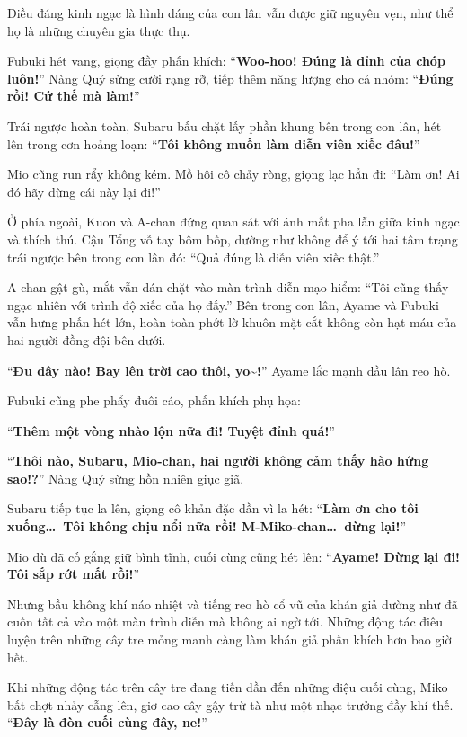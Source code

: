 \documentclass[../main.tex]{subfiles}
\begin{document}
Điều đáng kinh ngạc là hình dáng của con lân vẫn được giữ nguyên vẹn, như thể họ là những chuyên gia thực thụ.

Fubuki hét vang, giọng đầy phấn khích: ``\textbf{Woo-hoo! Đúng là đỉnh của chóp luôn!}'' Nàng Quỷ sừng cười rạng rỡ, tiếp thêm năng lượng cho cả nhóm: ``\textbf{Đúng rồi! Cứ thế mà làm!}''

Trái ngược hoàn toàn, Subaru bấu chặt lấy phần khung bên trong con lân, hét lên trong cơn hoảng loạn: ``\textbf{Tôi không muốn làm diễn viên xiếc đâu!}''

Mio cũng run rẩy không kém. Mồ hôi cô chảy ròng, giọng lạc hẳn đi: ``Làm ơn! Ai đó hãy dừng cái này lại đi!''

Ở phía ngoài, Kuon và A-chan đứng quan sát với ánh mắt pha lẫn giữa kinh ngạc và thích thú. Cậu Tổng vỗ tay bôm bốp, dường như không để ý tới hai tâm trạng trái ngược bên trong con lân đó: ``Quả đúng là diễn viên xiếc thật.''

A-chan gật gù, mắt vẫn dán chặt vào màn trình diễn mạo hiểm: ``Tôi cũng thấy ngạc nhiên với trình độ xiếc của họ đấy.'' Bên trong con lân, Ayame và Fubuki vẫn hưng phấn hét lớn, hoàn toàn phớt lờ khuôn mặt cắt không còn hạt máu của hai người đồng đội bên dưới.

``\textbf{Đu dây nào! Bay lên trời cao thôi, yo\~{}!}'' Ayame lắc mạnh đầu lân reo hò.

Fubuki cũng phe phẩy đuôi cáo, phấn khích phụ họa:

``\textbf{Thêm một vòng nhào lộn nữa đi! Tuyệt đỉnh quá!}''

``\textbf{Thôi nào, Subaru, Mio-chan, hai người không cảm thấy hào hứng sao!?}'' Nàng Quỷ sừng hồn nhiên giục giã.

Subaru tiếp tục la lên, giọng cô khản đặc dần vì la hét: ``\textbf{Làm ơn cho tôi xuống\dots\ Tôi không chịu nổi nữa rồi! M-Miko-chan\dots\ dừng lại!}''

Mio dù đã cố gắng giữ bình tĩnh, cuối cùng cũng hét lên: ``\textbf{Ayame! Dừng lại đi! Tôi sắp rớt mất rồi!}''

Nhưng bầu không khí náo nhiệt và tiếng reo hò cổ vũ của khán giả dường như đã cuốn tất cả vào một màn trình diễn mà không ai ngờ tới. Những động tác điêu luyện trên những cây tre mỏng manh càng làm khán giả phấn khích hơn bao giờ hết.

Khi những động tác trên cây tre đang tiến dần đến những điệu cuối cùng, Miko bất chợt nhảy cẫng lên, giơ cao cây gậy trừ tà như một nhạc trưởng đầy khí thế. ``\textbf{Đây là đòn cuối cùng đây, ne!}''
\end{document}
